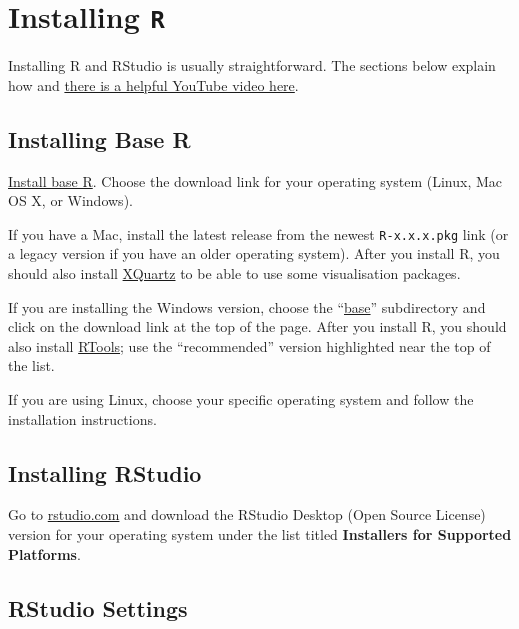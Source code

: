 \documentclass[
  oneside]{book}
\begin{document}
\hypertarget{appendix-appendices}{%
\appendix}


\hypertarget{installing-r}{%
\chapter{\texorpdfstring{Installing \texttt{R}}{Installing R}}\label{installing-r}}

Installing R and RStudio is usually straightforward. The sections below explain how and \href{https://www.youtube.com/watch?v=lVKMsaWju8w}{there is a helpful YouTube video here}.

\hypertarget{installing-base-r}{%
\section{Installing Base R}\label{installing-base-r}}

\href{https://cran.rstudio.com/}{Install base R}. Choose the download link for your operating system (Linux, Mac OS X, or Windows).

If you have a Mac, install the latest release from the newest \texttt{R-x.x.x.pkg} link (or a legacy version if you have an older operating system). After you install R, you should also install \href{http://xquartz.macosforge.org/}{XQuartz} to be able to use some visualisation packages.

If you are installing the Windows version, choose the ``\href{https://cran.rstudio.com/bin/windows/base/}{base}'' subdirectory and click on the download link at the top of the page. After you install R, you should also install \href{https://cran.rstudio.com/bin/windows/Rtools/}{RTools}; use the ``recommended'' version highlighted near the top of the list.

If you are using Linux, choose your specific operating system and follow the installation instructions.

\hypertarget{installing-rstudio}{%
\section{Installing RStudio}\label{installing-rstudio}}

Go to \href{https://www.rstudio.com/products/rstudio/download/\#download}{rstudio.com} and download the RStudio Desktop (Open Source License) version for your operating system under the list titled \textbf{Installers for Supported Platforms}.

\hypertarget{rstudio-settings}{%
\section{RStudio Settings}\label{rstudio-settings}}
\end{document}
